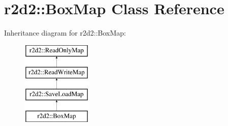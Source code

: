 \hypertarget{classr2d2_1_1_box_map}{}\section{r2d2\+:\+:Box\+Map Class Reference}
\label{classr2d2_1_1_box_map}
Inheritance diagram for r2d2\+:\+:Box\+Map\+:\begin{figure}[H]
\begin{center}
\leavevmode
\includegraphics[height=4.000000cm]{classr2d2_1_1_box_map}
\end{center}
\end{figure}
